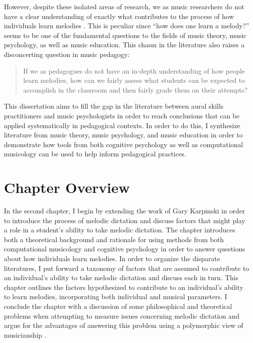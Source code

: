 \documentclass[12pt,]{book}
\begin{document}
However, despite these isolated areas of research, we as music researchers do not have a clear understanding of exactly what contributes to the process of how individuals learn melodies \citep{halpernMemoryMelodies2010}.
This is peculiar since ``how does one learn a melody?'' seems to be one of the fundamental questions to the fields of music theory, music psychology, as well as music education.
This chasm in the literature also raises a disconcerting question in music pedagogy:

\begin{quote}
If we as pedagogues do not have an in-depth understanding of how people learn melodies, how can we fairly assess what students can be expected to accomplish in the classroom and then fairly grade them on their attempts?
\end{quote}

This dissertation aims to fill the gap in the literature between aural skills practitioners and music psychologists in order to reach conclusions that can be applied systematically in pedagogical contexts.
In order to do this, I synthesize literature from music theory, music psychology, and music education in order to demonstrate how tools from both cognitive psychology as well as computational musicology can be used to help inform pedagogical practices.

\hypertarget{chapter-overview}{%
\section{Chapter Overview}\label{chapter-overview}}

In the second chapter, I begin by extending the work of Gary Karpinski \citep{karpinskiAuralSkillsAcquisition2000, karpinskiModelMusicPerception1990} in order to introduce the process of melodic dictation and discuss factors that might play a role in a student's ability to take melodic dictation.
The chapter introduces both a theoretical background and rationale for using methods from both computational musicology and cognitive psychology in order to answer questions about how individuals learn melodies.
In order to organize the disparate literatures, I put forward a taxonomy of factors that are assumed to contribute to an individual's ability to take melodic dictation and discuss each in turn.
This chapter outlines the factors hypothesized to contribute to an individual's ability to learn melodies, incorporating both individual and musical parameters.
I conclude the chapter with a discussion of some philosophical and theoretical problems when attempting to measure issues concerning melodic dictation and argue for the advantages of answering this problem using a polymorphic view of musicianship \citep{levitinWhatDoesIt2012, peretzNatureMusicBiological2006, bakerExaminingMusicalSophistication2018a}.
\end{document}
